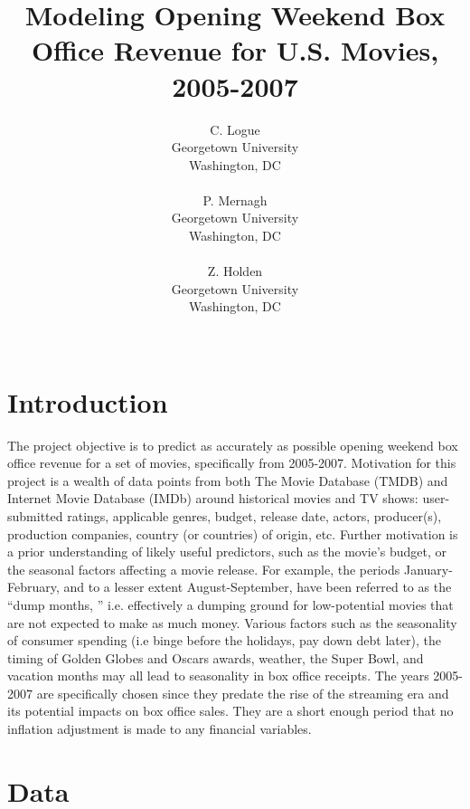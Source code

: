 \documentclass[10pt]{article}
\title{Modeling Opening Weekend Box Office Revenue for U.S. Movies, 2005-2007}
\author{
  C. Logue \\
  Georgetown University \\
  Washington, DC \\
\\\And
  P. Mernagh \\
  Georgetown University \\
  Washington, DC \\
\\\And
  Z. Holden \\
  Georgetown University \\
  Washington, DC \\
\\}
\begin{document}
\maketitle

\section{Introduction}
The project objective is to predict as accurately as possible opening weekend box office revenue for a set of movies, specifically from 2005-2007. Motivation for this project is a wealth of data points from both The Movie Database (TMDB) and Internet Movie Database (IMDb) around historical movies and TV shows: user-submitted ratings, applicable genres, budget, release date, actors, producer(s), production companies, country (or countries) of origin, etc. Further motivation is a prior understanding of likely useful predictors, such as the movie's budget, or the seasonal factors affecting a movie release. For example, the periods January-February, and to a lesser extent August-September, have been referred to as the ``dump months, '' i.e. effectively a dumping ground for low-potential movies that are not expected to make as much money. Various factors such as the seasonality of consumer spending (i.e binge before the holidays, pay down debt later), the timing of Golden Globes and Oscars awards, weather, the Super Bowl, and vacation months may all lead to seasonality in box office receipts.  The years 2005-2007 are specifically chosen since they predate the rise of the streaming era and its potential impacts on box office sales. They are a short enough period that no inflation adjustment is made to any financial variables. 
\section{Data}
\end{document}
